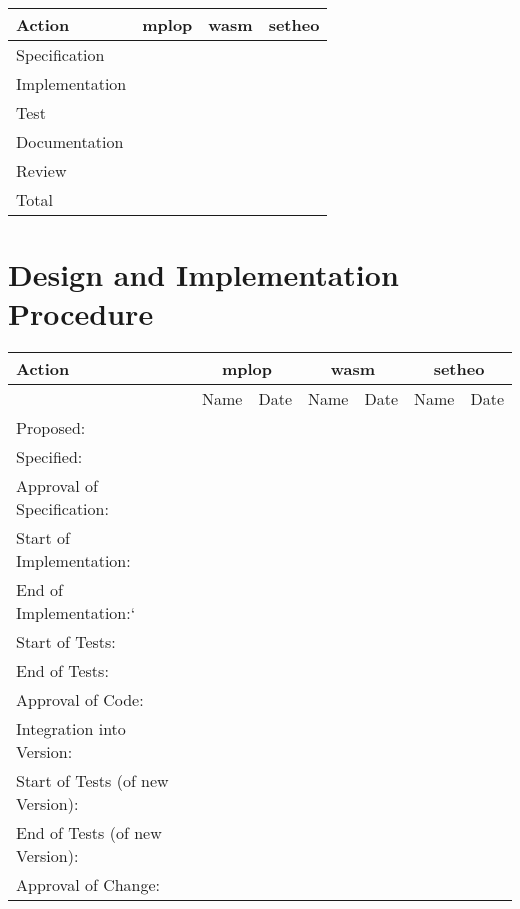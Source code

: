 \begin{center}
\begin{tabular}{|l|r|r|r|}
\hline\hline
Action & mplop & wasm & setheo \\
\hline
Specification & & & \\
Implementation & & & \\
Test & & & \\
Documentation & & & \\
Review & & & \\
\hline
Total & & & \\
\hline\hline
\end{tabular}
\end{center}


\section{Design and Implementation Procedure}

\begin{center}
\begin{tabular}{|l||c|c||c|c||c|c||}
\hline\hline
Action & \multicolumn{2}{|c|}{mplop} &
\multicolumn{2}{|c|}{wasm} & \multicolumn{2}{|c|}{setheo}  \\
\hline
& Name & Date & Name & Date & Name & Date \\
\hline\hline
 Proposed:& & & & & & \\
 Specified:& & & & & & \\
 Approval of Specification:& & & & & & \\
 Start of Implementation:& & & & & & \\
 End of Implementation:`& & & & & & \\
 Start of Tests:& & & & & & \\
 End of Tests:& & & & & & \\
 Approval of Code:& & & & & & \\
 Integration into Version: & & & & & & \\
 Start of Tests (of new Version):& & & & & & \\
 End of Tests (of new Version):& & & & & & \\
 Approval of Change:& & & & & & \\
\hline\hline
\end{tabular}
\end{center}


